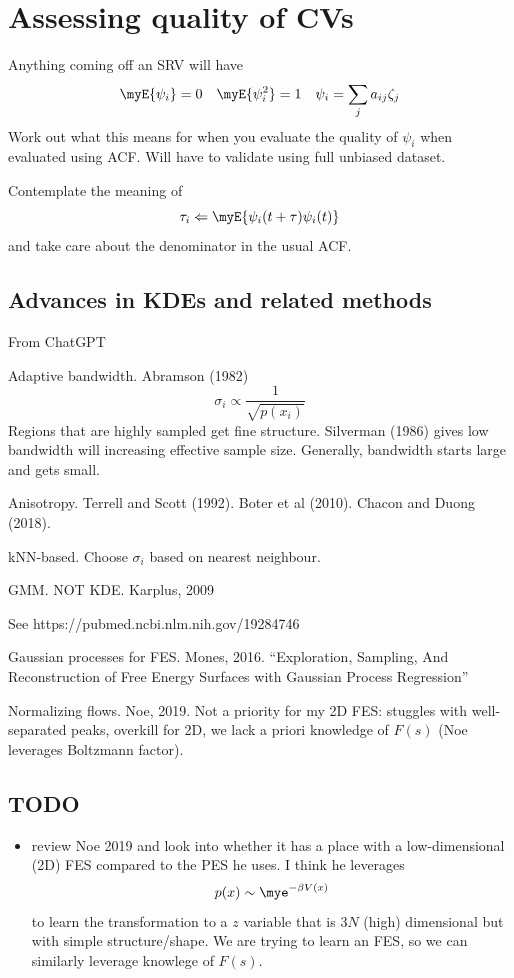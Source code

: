\section{Assessing quality of CVs}
Anything coming off an SRV will have
\[
    \myE{\psi_i} = 0 \quad \myE{\psi^2_i} = 1 \quad \psi_i=\sum_j a_{ij}\zeta_j
\]
Work out what this means for when you evaluate the quality of $\psi_i$ when evaluated using ACF.  Will have to validate using full unbiased dataset.

Contemplate the meaning of
\[
    \tau_i \Leftarrow \myE{\psi_i(t+\tau)\psi_i(t)}
\]
and take care about the denominator in the usual ACF.

\subsection{Advances in KDEs and related methods}
From ChatGPT
\begin{enumeratec}
    \item Adaptive bandwidth.  Abramson (1982)
    \[
        \sigma_i \propto\frac{1}{\sqrt{p(x_i)}}
    \]
    Regions that are highly sampled get fine structure.  Silverman (1986) gives low bandwidth will increasing effective sample size.  Generally, bandwidth starts large and gets small.
    \item Anisotropy.  Terrell and Scott (1992).  Boter et al (2010).  Chacon and Duong (2018).
    \item kNN-based.  Choose $\sigma_i$ based on nearest neighbour.
    \item GMM.  NOT KDE.  Karplus, 2009

    See https://pubmed.ncbi.nlm.nih.gov/19284746
    \item Gaussian processes for FES.  Mones, 2016.  ``Exploration, Sampling, And Reconstruction of Free Energy Surfaces with Gaussian Process Regression''
    \item Normalizing flows.  Noe, 2019.  Not a priority for my 2D FES: stuggles with well-separated peaks, overkill for 2D, we lack a priori knowledge of $F(s)$ (Noe leverages Boltzmann factor).
\end{enumeratec}

\subsection{TODO}
\begin{itemize}
    \item review Noe 2019 and look into whether it has a place with a low-dimensional (2D) FES compared to the PES he uses.  I think he leverages
    \[
        p(x) \sim \mye^{-\beta V(x)}
    \]
    to learn the transformation to a $z$ variable that is $3N$ (high) dimensional but with simple structure/shape.  We are trying to learn an FES, so we can similarly leverage knowlege of $F(s)$.
\end{itemize}

